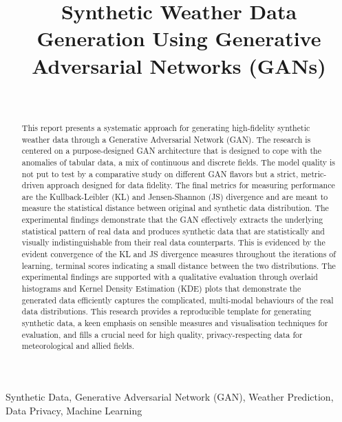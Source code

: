 \documentclass[12pt, draftclsnofoot, onecolumn]{IEEEtran}
\begin{document}
\title{Synthetic Weather Data Generation Using Generative Adversarial Networks (GANs)}

\author{
\\
}

\maketitle

\begin{abstract}
This report presents a systematic approach for generating high-fidelity synthetic weather data through a Generative Adversarial Network (GAN). The research is centered on a purpose-designed GAN architecture that is designed to cope with the anomalies of tabular data, a mix of continuous and discrete fields. The model quality is not put to test by a comparative study on different GAN flavors but a strict, metric-driven approach designed for data fidelity. The final metrics for measuring performance are the Kullback-Leibler (KL) and Jensen-Shannon (JS) divergence and are meant to measure the statistical distance between original and synthetic data distribution.
The experimental findings demonstrate that the GAN effectively extracts the underlying statistical pattern of real data and produces synthetic data that are statistically and visually indistinguishable from their real data counterparts. This is evidenced by the evident convergence of the KL and JS divergence measures throughout the iterations of learning, terminal scores indicating a small distance between the two distributions. The experimental findings are supported with a qualitative evaluation through overlaid histograms and Kernel Density Estimation (KDE) plots that demonstrate the generated data efficiently captures the complicated, multi-modal behaviours of the real data distributions. This research provides a reproducible template for generating synthetic data, a keen emphasis on sensible measures and visualisation techniques for evaluation, and fills a crucial need for high quality, privacy-respecting data for meteorological and allied fields.
\end{abstract}

\begin{IEEEkeywords}
Synthetic Data, Generative Adversarial Network (GAN), Weather Prediction, Data Privacy, Machine Learning
\end{IEEEkeywords}
\end{document}
